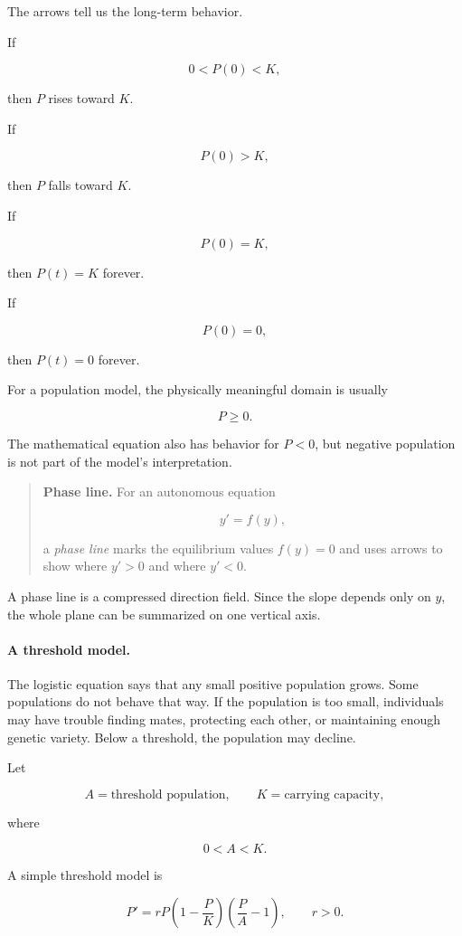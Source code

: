 The arrows tell us the long-term behavior.

If

\[
0<P(0)<K,
\]

then \(P\) rises toward \(K\).

If

\[
P(0)>K,
\]

then \(P\) falls toward \(K\).

If

\[
P(0)=K,
\]

then \(P(t)=K\) forever.

If

\[
P(0)=0,
\]

then \(P(t)=0\) forever.

For a population model, the physically meaningful domain is usually

\[
P\ge0.
\]

The mathematical equation also has behavior for \(P<0\), but negative population is
not part of the model's interpretation.

\begin{quote}
\textbf{Phase line.}
For an autonomous equation

\[
y'=f(y),
\]

a \emph{phase line} marks the equilibrium values \(f(y)=0\) and uses arrows to show
where \(y'>0\) and where \(y'<0\).
\end{quote}

A phase line is a compressed direction field.  Since the slope depends only on \(y\),
the whole plane can be summarized on one vertical axis.

\paragraph{A threshold model.}
The logistic equation says that any small positive population grows.  Some populations
do not behave that way.  If the population is too small, individuals may have trouble
finding mates, protecting each other, or maintaining enough genetic variety.  Below a
threshold, the population may decline.

Let

\[
A=\text{threshold population},
\qquad
K=\text{carrying capacity},
\]

where

\[
0<A<K.
\]

A simple threshold model is

\[
\boxed{
P'=rP\left(1-\frac{P}{K}\right)\left(\frac{P}{A}-1\right),
\qquad r>0.
}
\]

